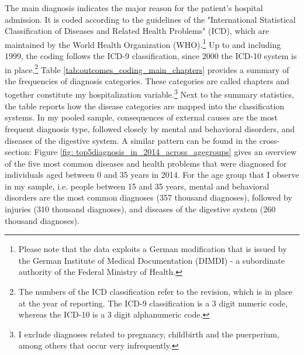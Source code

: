 \documentclass[11pt, a4paper]{article} %
\begin{document}
The main diagnosis indicates the major reason for the patient's hospital admission. It is coded according to the guidelines of the "International Statistical Classification of Diseases and Related Health Problems" (ICD), which are maintained by the World Health Organization (WHO).\footnote{Please note that the data exploits a German modification that is issued by the German Institute of Medical Documentation (DIMDI) - a subordinate authority of the Federal Ministry of Health.} Up to and including 1999, the coding follows the ICD-9 classification, since 2000 the ICD-10 system is in place.\footnote{The numbers of the ICD classification refer to the revision, which is in place at the year of reporting. The ICD-9 classification is a 3 digit numeric code, whereas the ICD-10 is a 3 digit alphanumeric code.} Table \ref{tab:outcomes_coding_main_chapters} provides a summary of the frequencies of diagnosis categories. These categories are called chapters and together constitute my hospitalization variable.\footnote{I exclude diagnoses related to pregnancy, childbirth and the puerperium, among others that occur very infrequently.} Next to the summary statistics, the table reports how the disease categories are mapped into the classification systems. In my pooled sample, consequences of external causes are the most frequent diagnosis type, followed closely by mental and behavioral disorders, and diseases of the digestive system. A similar pattern can be found in the cross-section: Figure \ref{fig: top5diagnosis_in_2014_across_agegroups} gives an overview of the five most common diseases and health problems that were diagnosed for individuals aged between 0 and 35 years in 2014. For the age group that I observe in my sample, i.e. people between 15 and 35 years, mental and behavioral disorders are the most common diagnoses (357 thousand diagnoses), followed by injuries (310 thousand diagnoses), and diseases of the digestive system (260 thousand diagnoses). \newline %
\end{document}

